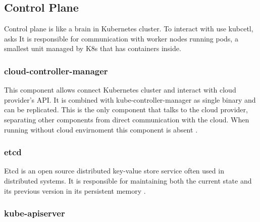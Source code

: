 %     






\subsection{Control Plane}
\label{sec:k8s_cplane}

Control plane is like a brain in Kubernetes cluster. To interact with use kubcetl, asks \textit{}It is responsible for communication with worker nodes running pods, a smallest unit managed by K8s that has containers inside.


\subsubsection{cloud-controller-manager}
\label{sec:cloudControllerManager}

This component allows connect Kubernetes cluster and interact with cloud provider's API. It is combined with kube-controller-manager as single binary and can be replicated. This is the only component that talks to the cloud provider, separating other components from direct communication with the cloud. When running without cloud envirnoment this component is absent \cite{KubernetesArch}.


\subsubsection{etcd}
\label{sec:etcd}

Etcd is an open source distributed key-value store service often used in distributed systems. It is responsible for maintaining both the current state and its previous version in its persistent memory \cite{KubernetesArch}\cite{Etcd}.


\subsubsection{kube-apiserver}
\label{sec:kubeApiServer}

